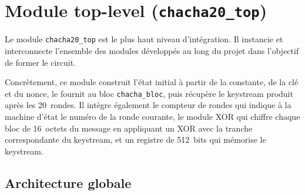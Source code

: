 \documentclass[12pt, a4paper]{article}
\newcommand{\module}[1]{\texttt{\textcolor{maincolor}{#1}}}
\begin{document}
\section{Module top-level (\texttt{chacha20\_top})}

Le module \module{chacha20\_top} est le plus haut niveau d'intégration. Il instancie et
interconnecte l'ensemble des modules développés au long du projet dans l'objectif de former
le circuit.

Concrètement, ce module construit l'état initial à partir de la constante, de la clé et du
nonce, le fournit au bloc \module{chacha\_bloc}, puis récupère le keystream produit après les
20~rondes. Il intègre également le compteur de rondes qui indique à la machine d'état le numéro
de la ronde courante, le module XOR qui chiffre chaque bloc de 16~octets du message en
appliquant un XOR avec la tranche correspondante du keystream, et un registre de 512~bits qui
mémorise le keystream.

\subsection{Architecture globale}
\end{document}
